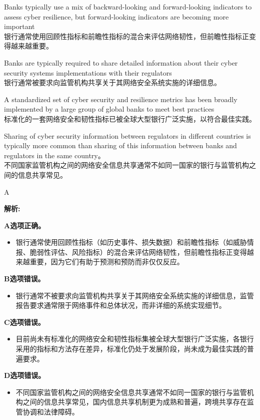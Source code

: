 \documentclass{article}
\newenvironment{explanation}
{\textbf{解析:}\par}
{\par}
\begin{document}
\begin{choices}
    \item Banks typically use a mix of backward-looking and forward-looking indicators to assess cyber resilience, but forward-looking indicators are becoming more important\\
    银行通常使用回顾性指标和前瞻性指标的混合来评估网络韧性，但前瞻性指标正变得越来越重要。
    \item Banks are typically required to share detailed information about their cyber security systems implementations with their regulators\\
    银行通常被要求向监管机构共享关于其网络安全系统实施的详细信息。
    \item A standardized set of cyber security and resilience metrics has been broadly implemented by a large group of global banks to meet best practices\\
    标准化的一套网络安全和韧性指标已被全球大型银行广泛实施，以符合最佳实践。
    \item Sharing of cyber security information between regulators in different countries is typically more common than sharing of this information between banks and regulators in the same country。\\
    不同国家监管机构之间的网络安全信息共享通常不如同一国家的银行与监管机构之间的信息共享常见。
\end{choices}

\begin{correctanswer}
    A
\end{correctanswer}

\begin{explanation}
    \textbf{A选项正确。}
    \begin{itemize}
        \item 银行通常使用回顾性指标（如历史事件、损失数据）和前瞻性指标（如威胁情报、脆弱性评估、风险指标）的混合来评估网络韧性，但前瞻性指标正变得越来越重要，因为它们有助于预测和预防而非仅仅反应。
    \end{itemize}

    \textbf{B选项错误。}
    \begin{itemize}
        \item 银行通常不被要求向监管机构共享关于其网络安全系统实施的详细信息，监管报告要求通常限于网络事件和总体状况，而非详细的系统实现细节。
    \end{itemize}

    \textbf{C选项错误。}
    \begin{itemize}
        \item 目前尚未有标准化的网络安全和韧性指标集被全球大型银行广泛实施，各银行采用的指标和方法存在差异，标准化仍处于发展阶段，尚未成为最佳实践的普遍要求。
    \end{itemize}

    \textbf{D选项错误。}
    \begin{itemize}
        \item 不同国家监管机构之间的网络安全信息共享通常不如同一国家的银行与监管机构之间的信息共享常见，国内信息共享机制更为成熟和普遍，跨境共享存在监管协调和法律障碍。
    \end{itemize}
\end{explanation}
\end{document}
